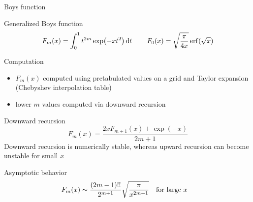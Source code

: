 \documentclass[aspectratio=169,9pt]{beamer}
\begin{document}
\begin{frame}{Boys function}
	\begin{block}{Generalized Boys function}
		\begin{equation*}
			F_m(x) = \int_0^1 t^{2m} \exp(-x t^2) \dd{t}
			\qquad
			F_0(x) = \sqrt{\frac{\pi}{4x}} \erf(\sqrt{x})
		\end{equation*}
	\end{block}
	\begin{block}{Computation}
		\begin{itemize}
			\item $F_m(x)$ computed using pretabulated values on a grid and Taylor expansion (Chebyshev interpolation table)
			\item lower $m$ values computed via downward recursion
		\end{itemize}
	\end{block}
	\begin{block}{Downward recursion}
		\begin{equation*}
			F_m(x) = \frac{2x F_{m+1} (x) + \exp(-x)}{2m+1}
		\end{equation*}
		Downward recursion is numerically stable, whereas upward recursion can become unstable for small $x$
	\end{block}
	\begin{block}{Asymptotic behavior}
		\begin{equation*}
			F_m(x) \sim \frac{(2m-1)!!}{2^{m+1}} \sqrt{\frac{\pi}{x^{2m+1}}}
			\qq{for large $x$}
		\end{equation*}
	\end{block}
\end{frame}

\end{document}
